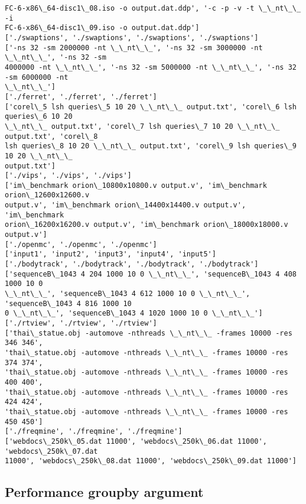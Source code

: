 \documentclass[11pt]{article}
\begin{document}
\begin{Verbatim}[commandchars=\\\{\}]
FC-6-x86\_64-disc1\_08.iso -o output.dat.ddp', '-c -p -v -t \_\_nt\_\_ -i
FC-6-x86\_64-disc1\_09.iso -o output.dat.ddp']
['./swaptions', './swaptions', './swaptions', './swaptions']
['-ns 32 -sm 2000000 -nt \_\_nt\_\_', '-ns 32 -sm 3000000 -nt \_\_nt\_\_', '-ns 32 -sm
4000000 -nt \_\_nt\_\_', '-ns 32 -sm 5000000 -nt \_\_nt\_\_', '-ns 32 -sm 6000000 -nt
\_\_nt\_\_']
['./ferret', './ferret', './ferret']
['corel\_5 lsh queries\_5 10 20 \_\_nt\_\_ output.txt', 'corel\_6 lsh queries\_6 10 20
\_\_nt\_\_ output.txt', 'corel\_7 lsh queries\_7 10 20 \_\_nt\_\_ output.txt', 'corel\_8
lsh queries\_8 10 20 \_\_nt\_\_ output.txt', 'corel\_9 lsh queries\_9 10 20 \_\_nt\_\_
output.txt']
['./vips', './vips', './vips']
['im\_benchmark orion\_10800x10800.v output.v', 'im\_benchmark orion\_12600x12600.v
output.v', 'im\_benchmark orion\_14400x14400.v output.v', 'im\_benchmark
orion\_16200x16200.v output.v', 'im\_benchmark orion\_18000x18000.v output.v']
['./openmc', './openmc', './openmc']
['input1', 'input2', 'input3', 'input4', 'input5']
['./bodytrack', './bodytrack', './bodytrack', './bodytrack']
['sequenceB\_1043 4 204 1000 10 0 \_\_nt\_\_', 'sequenceB\_1043 4 408 1000 10 0
\_\_nt\_\_', 'sequenceB\_1043 4 612 1000 10 0 \_\_nt\_\_', 'sequenceB\_1043 4 816 1000 10
0 \_\_nt\_\_', 'sequenceB\_1043 4 1020 1000 10 0 \_\_nt\_\_']
['./rtview', './rtview', './rtview']
['thai\_statue.obj -automove -nthreads \_\_nt\_\_ -frames 10000 -res 346 346',
'thai\_statue.obj -automove -nthreads \_\_nt\_\_ -frames 10000 -res 374 374',
'thai\_statue.obj -automove -nthreads \_\_nt\_\_ -frames 10000 -res 400 400',
'thai\_statue.obj -automove -nthreads \_\_nt\_\_ -frames 10000 -res 424 424',
'thai\_statue.obj -automove -nthreads \_\_nt\_\_ -frames 10000 -res 450 450']
['./freqmine', './freqmine', './freqmine']
['webdocs\_250k\_05.dat 11000', 'webdocs\_250k\_06.dat 11000', 'webdocs\_250k\_07.dat
11000', 'webdocs\_250k\_08.dat 11000', 'webdocs\_250k\_09.dat 11000']
    \end{Verbatim}

    \hypertarget{performance-groupby-argument}{%
\subsection{Performance groupby
argument}\label{performance-groupby-argument}}
\end{document}
